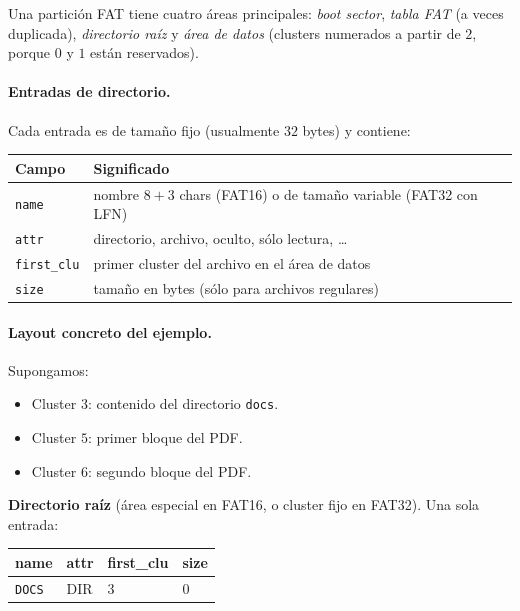 \documentclass[11pt,a4paper]{article}
\begin{document}
Una partición FAT tiene cuatro áreas principales: \emph{boot sector},
\emph{tabla FAT} (a veces duplicada), \emph{directorio raíz} y
\emph{área de datos} (clusters numerados a partir de $2$, porque $0$ y
$1$ están reservados).

\paragraph{Entradas de directorio.} Cada entrada es de tamaño fijo
(usualmente $32$ bytes) y contiene:

\begin{center}
\small
\begin{tabular}{@{}lp{8.5cm}@{}}
\toprule
Campo & Significado \\
\midrule
\texttt{name}        & nombre $8 + 3$ chars (FAT16) o de tamaño variable (FAT32 con LFN) \\
\texttt{attr}        & directorio, archivo, oculto, sólo lectura, \ldots \\
\texttt{first\_clu}  & primer cluster del archivo en el área de datos \\
\texttt{size}        & tamaño en bytes (sólo para archivos regulares) \\
\bottomrule
\end{tabular}
\end{center}

\paragraph{Layout concreto del ejemplo.} Supongamos:

\begin{itemize}[leftmargin=*,nosep]
    \item Cluster $3$: contenido del directorio \texttt{docs}.
    \item Cluster $5$: primer bloque del PDF.
    \item Cluster $6$: segundo bloque del PDF.
\end{itemize}

\textbf{Directorio raíz} (área especial en FAT16, o cluster fijo en
FAT32). Una sola entrada:

\begin{center}
\small
\begin{tabular}{@{}llll@{}}
\toprule
name & attr & first\_clu & size \\
\midrule
\texttt{DOCS} & DIR & $3$ & $0$ \\
\bottomrule
\end{tabular}
\end{center}
\end{document}
